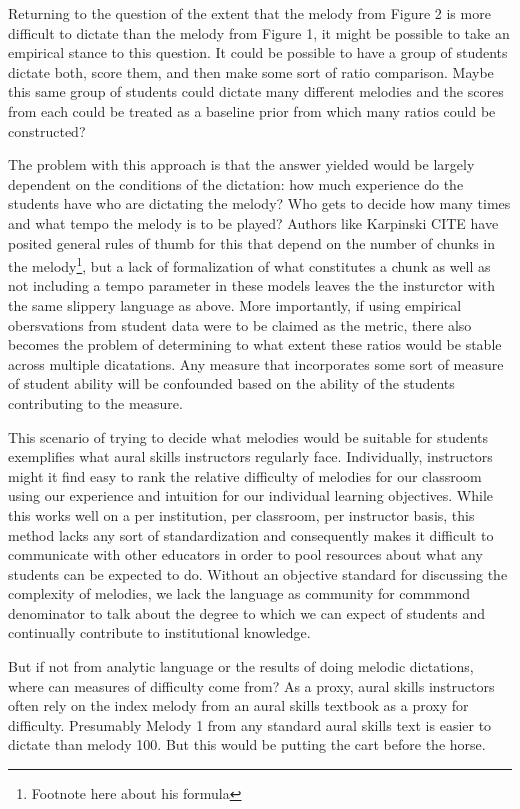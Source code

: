\documentclass[english,man,floatsintext]{apa6}
\begin{document}
Returning to the question of the extent that the melody from Figure 2 is more difficult to dictate than the melody from Figure 1, it might be possible to take an empirical stance to this question.
It could be possible to have a group of students dictate both, score them, and then make some sort of ratio comparison.
Maybe this same group of students could dictate many different melodies and the scores from each could be treated as a baseline prior from which many ratios could be constructed?

The problem with this approach is that the answer yielded would be largely dependent on the conditions of the dictation: how much experience do the students have who are dictating the melody?
Who gets to decide how many times and what tempo the melody is to be played?
Authors like Karpinski CITE have posited general rules of thumb for this that depend on the number of chunks in the melody\footnote{Footnote here about his formula}, but a lack of formalization of what constitutes a chunk as well as not including a tempo parameter in these models leaves the the insturctor with the same slippery language as above.
More importantly, if using empirical obersvations from student data were to be claimed as the metric, there also becomes the problem of determining to what extent these ratios would be stable across multiple dicatations.
Any measure that incorporates some sort of measure of student ability will be confounded based on the ability of the students contributing to the measure.

This scenario of trying to decide what melodies would be suitable for students exemplifies what aural skills instructors regularly face.
Individually, instructors might it find easy to rank the relative difficulty of melodies for our classroom using our experience and intuition for our individual learning objectives.
While this works well on a per institution, per classroom, per instructor basis, this method lacks any sort of standardization and consequently makes it difficult to communicate with other educators in order to pool resources about what any students can be expected to do.
Without an objective standard for discussing the complexity of melodies, we lack the language as community for commmond denominator to talk about the degree to which we can expect of students and continually contribute to institutional knowledge.

But if not from analytic language or the results of doing melodic dictations, where can measures of difficulty come from?
As a proxy, aural skills instructors often rely on the index melody from an aural skills textbook as a proxy for difficulty.
Presumably Melody 1 from any standard aural skills text is easier to dictate than melody 100.
But this would be putting the cart before the horse.
\end{document}
